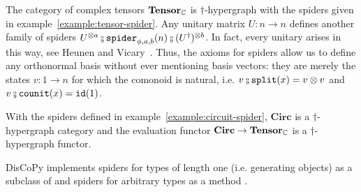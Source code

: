 \begin{example}
The category of complex tensors $\mathbf{Tensor}_{\mathbb{C}}$ is $\dagger$-hypergraph with the spiders given in example~\ref{example:tensor-spider}.
Any unitary matrix $U : n \to n$ defines another family of spiders $U^{\otimes a} \fcmp \spider_{\phi, a, b}(n) \fcmp (U^\dagger)^{\otimes b}$.
In fact, every unitary arises in this way, see Heunen and Vicary~\cite[Corollary 5.32]{HeunenVicary19a}.
Thus, the axioms for spiders allow us to define any orthonormal basis without ever mentioning basis vectors: they are merely the states $v : 1 \to n$ for which the comonoid is natural, i.e. $v \fcmp \ttsplit(x) = v \otimes v$ and $v \fcmp \counit(x) = \id(1)$.
\end{example}

\begin{example}
With the spiders defined in example~\ref{example:circuit-spider}, $\mathbf{Circ}$ is a $\dagger$-hypergraph category and the evaluation functor $\mathbf{Circ} \to \mathbf{Tensor}_{\mathbb{C}}$ is a $\dagger$-hypergraph functor.
\end{example}

DisCoPy implements spiders for types of length one (i.e. generating objects) as a subclass of  and spiders for arbitrary types as a method .


